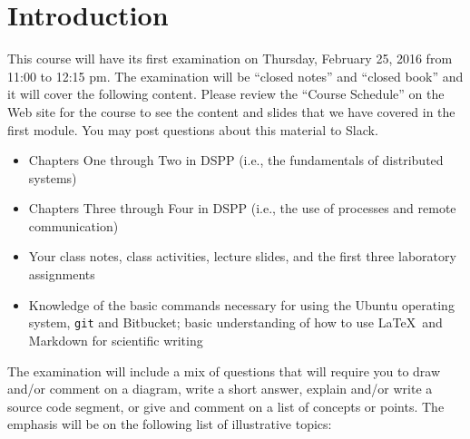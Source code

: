 


\section*{Introduction}

This course will have its first examination on Thursday, February 25, 2016 from 11:00 to 12:15 pm. The examination will
be ``closed notes'' and ``closed book'' and it will cover the following content. Please review the ``Course Schedule''
on the Web site for the course to see the content and slides that we have covered in the first module. You may post
questions about this material to Slack.

\begin{itemize}

  \itemsep 0in

  \item Chapters One through Two in DSPP (i.e., the fundamentals of distributed systems)

  \item Chapters Three through Four in DSPP (i.e., the use of processes and remote communication)

  \item Your class notes, class activities, lecture slides, and the first three laboratory assignments

  \item Knowledge of the basic commands necessary for using the Ubuntu operating system, {\tt git} and Bitbucket; basic
    understanding of how to use \LaTeX~and Markdown for scientific writing

\end{itemize}

\vspace*{-.05in}

\noindent The examination will include a mix of questions that will require you to draw and/or comment on a diagram,
write a short answer, explain and/or write a source code segment, or give and comment on a list of concepts or points.
The emphasis will be on the following list of illustrative topics:

